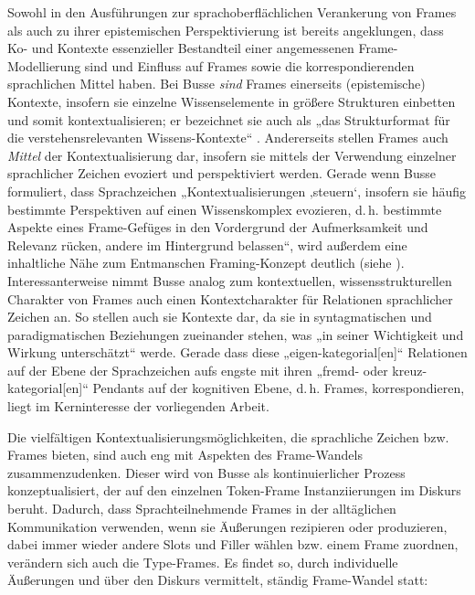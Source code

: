 Sowohl in den Ausführungen zur sprachoberflächlichen Verankerung von Frames als auch zu ihrer epistemischen Perspektivierung ist bereits angeklungen, dass Ko- und Kontexte essenzieller Bestandteil einer angemessenen Frame-Modellierung sind und Einfluss auf Frames sowie die korrespondierenden sprachlichen Mittel haben. Bei Busse \emph{sind} Frames einerseits (epistemische) Kontexte, insofern sie einzelne Wissenselemente in größere Strukturen einbetten und somit kontextualisieren; er bezeichnet sie auch als „das Strukturformat für die verstehensrelevanten Wissens-Kontexte`` \autocite[664]{busseFrameSemantikKompendium2012}. Andererseits stellen Frames auch \emph{Mittel} der Kontextualisierung dar, insofern sie mittels der Verwendung einzelner sprachlicher Zeichen evoziert und perspektiviert werden. Gerade wenn Busse formuliert, dass Sprachzeichen „Kontextualisierungen ‚steuern`, insofern sie häufig bestimmte Perspektiven auf einen Wissenskomplex evozieren, d.\,h. bestimmte Aspekte eines Frame-Gefüges in den Vordergrund der Aufmerksamkeit und Relevanz rücken, andere im Hintergrund belassen``, \autocite[664]{busseFrameSemantikKompendium2012} wird außerdem eine inhaltliche Nähe zum Entmanschen Framing-Konzept deutlich (siehe ). Interessanterweise nimmt Busse analog zum kontextuellen, wissensstrukturellen Charakter von Frames auch einen Kontextcharakter für Relationen sprachlicher Zeichen an. So stellen auch sie Kontexte dar, da sie in syntagmatischen und paradigmatischen Beziehungen zueinander stehen, was „in seiner Wichtigkeit und Wirkung unterschätzt`` \autocite[87]{busseDiskurslinguistikAlsKontextualisierung2007} werde. Gerade dass diese „eigen-kategorial{[}en{]}`` Relationen auf der Ebene der Sprachzeichen aufs engste mit ihren „fremd- oder kreuz-kategorial{[}en{]}`` \autocite[87]{busseDiskurslinguistikAlsKontextualisierung2007} Pendants auf der kognitiven Ebene, d.\,h. Frames, korrespondieren, liegt im Kerninteresse der vorliegenden Arbeit.

Die vielfältigen Kontextualisierungsmöglichkeiten, die sprachliche Zeichen bzw. Frames bieten, sind auch eng mit Aspekten des Frame-Wandels zusammenzudenken. Dieser wird von Busse als kontinuierlicher Prozess konzeptualisiert, der auf den einzelnen Token-Frame Instanziierungen im Diskurs beruht. Dadurch, dass Sprachteilnehmende Frames in der alltäglichen Kommunikation verwenden, wenn sie Äußerungen rezipieren oder produzieren, dabei immer wieder andere Slots und Filler wählen bzw. einem Frame zuordnen, verändern sich auch die Type-Frames. Es findet so, durch individuelle Äußerungen und über den Diskurs vermittelt, ständig Frame-Wandel statt:

